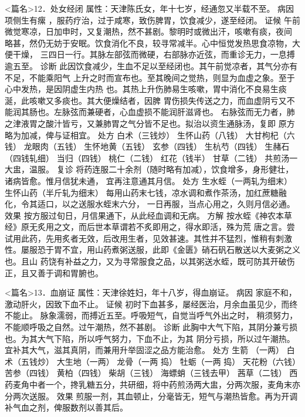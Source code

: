 \documentclass[a4paper,12pt,UTF8,twoside]{ctexbook}
\begin{document}
<篇名>12．处女经闭
属性：天津陈氏女，年十七岁，经通忽又半载不至。 
病因 项侧生有瘰 ，服药疗治，过于咸寒，致伤脾胃，饮食减少，遂至经闭。 
证候 午前微觉寒凉，日加申时，又复潮热，然不甚剧。黎明时或微出汗，咳嗽有痰，夜间 
略甚，然仍无妨于安眠。饮食消化不良，较寻常减半。心中恒觉发热思食凉物，大便干燥， 
三四日一行。其脉左部弦而微硬，右部脉亦近弦，而重诊无力，一息搏逾五至。 
诊断 此因饮食减少，生血不足以至经闭也。其午前觉凉者，其气分亦有不足，不能乘阳气 
上升之时而宣布也。至其晚间之觉热，则显为血虚之象。至于心中发热，是因阴虚生内热 
也。其热上升伤肺易生咳嗽，胃中消化不良易生痰涎，此咳嗽又多痰也。其大便燥结者，因脾 
胃伤损失传送之力，而血虚阴亏又不能润其肠也。左脉弦而兼硬者，心血虚损不能润肝滋肾也。 
右脉弦而无力者，肺之津液胃之酸汁皆亏，又兼肺胃之气分皆不足也。拟治以资生通脉汤，复即 
原方略为加减，俾与证相宜。 
处方 白术（三钱炒） 生怀山药（八钱） 大甘枸杞（六钱） 龙眼肉（五钱） 
生怀地黄（五钱） 玄参（四钱） 生杭芍（四钱） 生赭石（四钱轧细） 
当归（四钱） 桃仁（二钱） 红花（钱半） 甘草（二钱） 
共煎汤一大盅，温服。 
复诊 将药连服二十余剂（随时略有加减），饮食增多，身形健壮，诸病皆愈。惟月信犹未通， 
宜再注意通其月信。 
处方 生水蛭（一两轧为细末） 生怀山药（半斤轧为细末） 
每用山药末七钱，凉水调和煮作茶汤，加红蔗糖融化，令其适口，以之送服水蛭末六分， 
一日再服，当点心用之，久则月信必通。 
效果 按方服过旬日，月信果通下，从此经血调和无病。 
方解 按水蛭《神农本草经》原无炙用之文，而后世本草谓若不炙即用之，得水即活，殊为荒 
唐之言。尝试用此药，先用炙者无效，后改用生者，见效甚速。其性并不猛烈，惟稍有刺激 
性。屡服恐于胃不宜，用山药煮粥送服，此即《金匮》硝石矾石散送以大麦粥之义也。且山 
药饶有补益之力，又为寻常服食之品，以其粥送水蛭，既可防其开破伤正，且又善于调和胃腑也。 


<篇名>13．血崩证
属性：天津徐姓妇，年十八岁，得血崩证。 
病因 家庭不和，激动肝火，因致下血不止。 
证候 初时下血甚多，屡经医治，月余血虽见少，而终不能止。 
脉象濡弱，而搏近五至。呼吸短气，自觉当呼气外出之时， 
稍须努力，不能顺呼吸之自然。过午潮热，然不甚剧。 
诊断 此胸中大气下陷，其阴分兼亏损也。为其大气下陷，所以呼气努力，下血不止，为其 
阴分亏损，所以过午潮热。宜补其大气，滋其真阴，而兼用升举固涩之品方能治愈。 
处方 生箭 （一两） 白术（五钱炒） 大生地（一两） 龙骨（一两 捣） 
牡蛎（一两 捣） 天花粉（六钱） 苦参（四钱） 黄柏（四钱） 
柴胡（三钱） 海螵蛸（三钱去甲） 茜草（二钱） 
西药麦角中者一个，搀乳糖五分，共研细，将中药煎汤两大盅，分两次服，麦角末亦分两次送服。 
效果 煎服一剂，其血顿止，分毫皆无，短气与潮热皆愈。再为开调补气血之剂，俾服数剂以善其后。 
\end{document}
